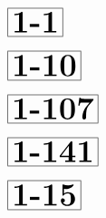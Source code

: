 \documentclass[a4paper, 10pt]{article}
\begin{document}
\thispagestyle{empty}
\begin{minipage}[t]{0.15\textwidth}
                \vspace*{-1.59cm}
        \hspace*{1.25cm}
        $\boxed{\textbf{\Huge1-1}}$
\end{minipage}
\begin{minipage}[t]{0.85\textwidth}
    
\end{minipage}

\begin{minipage}[t]{0.15\textwidth}
                \vspace*{-1.59cm}
        \hspace*{0.75cm}
        $\boxed{\textbf{\Huge1-10}}$
\end{minipage}
\begin{minipage}[t]{0.85\textwidth}
    
\end{minipage}

\begin{minipage}[t]{0.15\textwidth}
                \vspace*{-1.59cm}
        \hspace*{0.25cm}
        $\boxed{\textbf{\Huge1-107}}$
\end{minipage}
\begin{minipage}[t]{0.85\textwidth}
    
\end{minipage}

\begin{minipage}[t]{0.15\textwidth}
                \vspace*{-1.59cm}
        \hspace*{0.25cm}
        $\boxed{\textbf{\Huge1-141}}$
\end{minipage}
\begin{minipage}[t]{0.85\textwidth}
    
\end{minipage}

\begin{minipage}[t]{0.15\textwidth}
                \vspace*{-1.59cm}
        \hspace*{0.75cm}
        $\boxed{\textbf{\Huge1-15}}$
\end{minipage}
\begin{minipage}[t]{0.85\textwidth}
    
\end{minipage}
\end{document}
